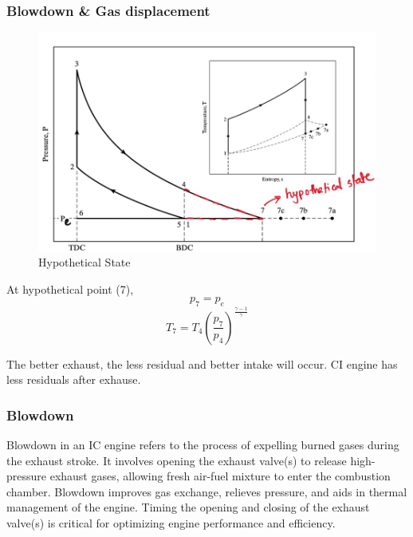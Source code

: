 \documentclass{article}
\begin{document}
  \subsubsection*{Blowdown \& Gas displacement}
  \begin{figure}[h]
	\begin{center}
		\includegraphics[width=0.75\linewidth]{img/hypothetical_state.jpeg}
		\caption{Hypothetical State}
	\end{center}
  \end{figure}
  At hypothetical point (7), 
  $$p_7 = p_e$$ 
  $$T_7 = T_4 \left(\frac{p_7}{p_4}\right)^\frac{\gamma - 1}{\gamma}$$

  \textbullet The better exhaust, the less residual and better intake will occur. CI engine has less residuals after exhause. \\
  
  \subsubsection*{Blowdown}
  Blowdown in an IC engine refers to the process of expelling burned gases during the exhaust stroke. It involves opening the exhaust valve(s) to release high-pressure exhaust gases, allowing fresh air-fuel mixture to enter the combustion chamber. Blowdown improves gas exchange, relieves pressure, and aids in thermal management of the engine. Timing the opening and closing of the exhaust valve(s) is critical for optimizing engine performance and efficiency.
\end{document}
